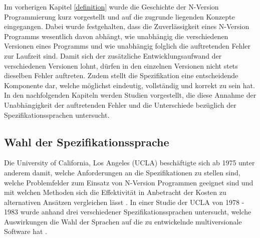 %
Im vorherigen Kapitel \ref{definition} wurde die Geschichte der N-Version Programmierung kurz vorgestellt und auf die zugrunde liegenden Konzepte eingegangen.
Dabei wurde festgehalten, dass die Zuverlässigkeit eines N-Version Programms wesentlich davon abhängt, wie unabhängig die verschiedenen Versionen eines Programms und wie unabhängig folglich die auftretenden Fehler zur Laufzeit sind. Damit sich der zusätzliche Entwicklungsaufwand der verschiedenen Versionen lohnt, dürfen in den einzelnen Versionen nicht stets dieselben Fehler auftreten.
Zudem stellt die Spezifikation eine entscheidende Komponente dar, welche möglichst eindeutig, vollständig und korrekt zu sein hat.
In den nachfolgenden Kapiteln werden Studien vorgestellt, die diese Annahme der Unabhängigkeit der auftretenden Fehler und die Unterschiede bezüglich der Spezifikationssprachen untersucht.
%
\subsection{Wahl der Spezifikationssprache}\label{uclastudies}
Die University of California, Los Angeles (UCLA) beschäftigte sich ab 1975 unter anderem damit, welche Anforderungen an die Spezifikationen zu stellen sind, welche Problemfelder zum Einsatz von N-Version Programmen geeignet sind und mit welchen Methoden sich die Effektivität in Anbetracht der Kosten zu alternativen Ansätzen vergleichen lässt \cite{Avizienis:1985:NAF:1314034.1314064}.
In einer Studie der UCLA von 1978 - 1983 wurde anhand drei verschiedener Spezifikationssprachen untersucht, welche Auswirkungen die Wahl der Sprachen auf die zu entwickelnde multiversionale Software hat \cite{methodology}.
